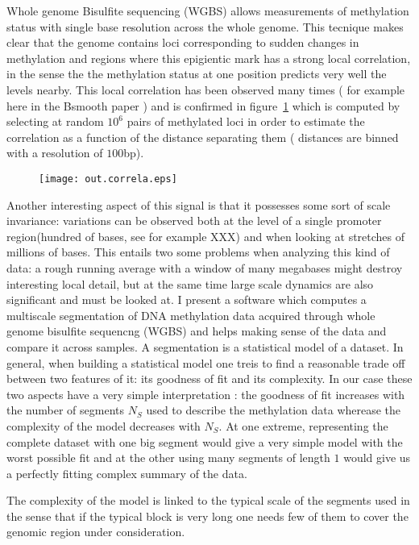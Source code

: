 \documentclass[11pt]{amsart}
\begin{document}
Whole genome Bisulfite sequencing (WGBS) allows measurements of methylation 
status with single base resolution across the whole genome. This tecnique makes 
clear that the genome contains loci corresponding to sudden changes in methylation 
and regions where this epigientic mark has a strong local
correlation, in the sense the the methylation status at one position predicts 
very well the levels nearby. 
This local correlation has been observed many times ( for example
here in the Bsmooth paper
\cite{bsmooth}) and is confirmed in figure~\ref{corr} which is computed by 
selecting at random $10^6$ pairs 
of methylated loci in order to estimate the correlation as a function of the 
distance separating them ( distances
are binned with a resolution of $100$bp).

\begin{figure}\label{corr}
\texttt{[image: out.correla.eps]}
\end{figure}

Another interesting aspect of this signal is that it possesses some sort of scale 
invariance: variations can be observed both at the level of a single promoter
region(hundred of bases, see for example XXX) and when looking at stretches
of millions of bases.
This entails two some problems when analyzing this kind of data: a rough
running average with a window of many megabases might destroy interesting
local detail, but at the same time large scale dynamics are also
significant and must be looked at.
I present  a software which computes a multiscale segmentation of DNA methylation 
data acquired through whole genome bisulfite sequencng (WGBS) and
helps making sense of the data and compare it across samples.
A segmentation is a statistical model of a dataset. 
In general, when building a statistical model one treis to find a reasonable 
trade off between two 
features of it: its goodness of fit and its complexity.
In our case these two aspects have a very simple interpretation : the goodness 
of fit increases with the number of segments $N_S$ used to describe the 
methylation data wherease the complexity of the model decreases with $N_S$.  
At one extreme, representing the complete dataset with one big segment would 
give a very simple model with the worst possible fit and 
at the other using many segments of length $1$ would give us a perfectly 
fitting complex summary of the data.

The complexity of the model is linked to the typical scale of the segments used
in the sense that if the typical block is very long one needs few of them to 
cover the genomic region under consideration.
\end{document}
